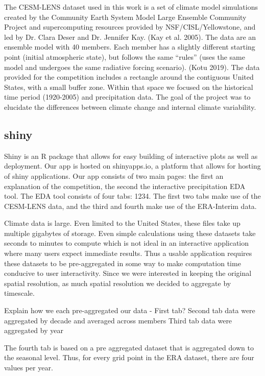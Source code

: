 \documentclass[10pt,letterpaper]{article}
\begin{document}
The CESM-LENS dataset used in this work is a set of climate model simulations created by the Community Earth System Model Large Ensemble Community Project and supercomputing resources provided by NSF/CISL/Yellowstone, and led by Dr. Clara Deser and Dr. Jennifer Kay. (Kay et al. 2005)\cite{CESM}. The data are an ensemble model with 40 members. Each member has a slightly different starting point (initial atmospheric state), but follows the same “rules” (uses the same model and undergoes the same radiative forcing scenario). (Kotu 2019). The data provided for the competition includes a rectangle around the contiguous United States, with a small buffer zone. Within that space we focused on the historical time period (1920-2005) and precipitation data. The goal of the project was to elucidate the differences between climate change and internal climate variability.

\subsection*{shiny}
Shiny\cite{shiny} is an R package that allows for easy building of interactive plots as well as deployment. Our app is hosted on shinyapps.io, a platform that allows for hosting of shiny applications. Our app consists of two main pages: the first an explanation of the competition, the second the interactive precipitation EDA tool. The EDA tool consists of four tabs: 1234. The first two tabs make use of the CESM-LENS data, and the third and fourth make use of the ERA-Interim data.

Climate data is large. Even limited to the United States, these files take up multiple gigabytes of storage. Even simple calculations using these datasets take seconds to minutes to compute which is not ideal in an interactive application where many users expect immediate results. Thus a usable application requires these datasets to be pre-aggregated in some way to make computation time conducive to user interactivity. Since we were interested in keeping the original spatial resolution, as much spatial resolution we decided to aggregate by timescale.

Explain how we each pre-aggregated our data -
First tab?
Second tab data were aggregated by decade and averaged across members
Third tab data were aggregated by year

The fourth tab is based on a pre aggregated dataset that is aggregated down to the seasonal level. Thus, for every grid point in the ERA dataset, there are four values per year.
\end{document}
